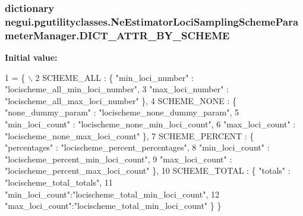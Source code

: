\subsubsection[{\texorpdfstring{D\+I\+C\+T\+\_\+\+A\+T\+T\+R\+\_\+\+B\+Y\+\_\+\+S\+C\+H\+E\+ME}{DICT_ATTR_BY_SCHEME}}]{\setlength{\rightskip}{0pt plus 5cm}dictionary negui.\+pgutilityclasses.\+Ne\+Estimator\+Loci\+Sampling\+Scheme\+Parameter\+Manager.\+D\+I\+C\+T\+\_\+\+A\+T\+T\+R\+\_\+\+B\+Y\+\_\+\+S\+C\+H\+E\+ME\hspace{0.3cm}{\ttfamily [static]}}\hypertarget{classnegui_1_1pgutilityclasses_1_1NeEstimatorLociSamplingSchemeParameterManager_a63c5ab3bf699b817725fceebbdcc440e}{}\label{classnegui_1_1pgutilityclasses_1_1NeEstimatorLociSamplingSchemeParameterManager_a63c5ab3bf699b817725fceebbdcc440e}
{\bfseries Initial value\+:}
\begin{DoxyCode}
1 = \{ \(\backslash\)
2                 SCHEME\_ALL : \{ \textcolor{stringliteral}{"min\_loci\_number"} : \textcolor{stringliteral}{"locischeme\_all\_min\_loci\_number"},
3                                 \textcolor{stringliteral}{"max\_loci\_number"} : \textcolor{stringliteral}{"locischeme\_all\_max\_loci\_number"} \},
4                 SCHEME\_NONE : \{ \textcolor{stringliteral}{"none\_dummy\_param"} : \textcolor{stringliteral}{"locischeme\_none\_dummy\_param"},
5                                     \textcolor{stringliteral}{"min\_loci\_count"} : \textcolor{stringliteral}{"locischeme\_none\_min\_loci\_count"},
6                                     \textcolor{stringliteral}{"max\_loci\_count"} : \textcolor{stringliteral}{"locischeme\_none\_max\_loci\_count"} \}, 
7                 SCHEME\_PERCENT : \{ \textcolor{stringliteral}{"percentages"} : \textcolor{stringliteral}{"locischeme\_percent\_percentages"},
8                                     \textcolor{stringliteral}{"min\_loci\_count"} : \textcolor{stringliteral}{"locischeme\_percent\_min\_loci\_count"},
9                                     \textcolor{stringliteral}{"max\_loci\_count"} : \textcolor{stringliteral}{"locischeme\_percent\_max\_loci\_count"} \},
10                 SCHEME\_TOTAL : \{ \textcolor{stringliteral}{"totals"} : \textcolor{stringliteral}{"locischeme\_total\_totals"}, 
11                                         \textcolor{stringliteral}{"min\_loci\_count"}:\textcolor{stringliteral}{"locischeme\_total\_min\_loci\_count"},
12                                         \textcolor{stringliteral}{"max\_loci\_count"}:\textcolor{stringliteral}{"locischeme\_total\_min\_loci\_count"} \} \}
\end{DoxyCode}


